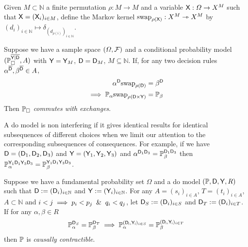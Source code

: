 \begin{definition}
Given $M\subset \mathbb{N}$ a finite permutation $\rho:M\to M$ and a variable $\mathsf{X}:\Omega\to X^M$ such that $\mathsf{X}=(\mathsf{X}_i)_{i\in M}$, define the Markov kernel $\text{swap}_{\rho(\mathsf{X})}:X^M\rightarrowtriangle X^M$ by $(d_i)_{i\in\mathbb{N}}\mapsto \delta_{(d_{\rho(i)})_{i\in\mathbb{N}}}$.
\end{definition}

\begin{definition}\label{def:caus_exch}
Suppose we have a sample space $(\Omega,\mathcal{F})$ and a conditional probability model $(\mathbb{P}_{\square}^{\overline{\mathsf{Y}|\mathsf{D}}},A)$ with $\mathsf{Y}=\mathsf{Y}_M$, $\mathsf{D}=\mathsf{D}_M$, $M\subseteq \mathbb{N}$. If, for any two decision rules $\alpha^{\overline{\mathsf{D}}},\beta^{\overline{\mathsf{D}}} \in A$,
\begin{align}
    \alpha^{\mathsf{D}}\text{swap}_{\rho(\mathsf{D})} &= \beta^{\mathsf{D}}\\
    \implies  \mathbb{P}_\alpha\text{swap}_{\rho(\mathsf{D}\times \mathsf{Y})}&=\mathbb{P}_\beta
\end{align}
Then $\mathbb{P}_\square$ \emph{commutes with exchanges}.
\end{definition}

A do model is non interfering if it gives identical results for identical subsequences of different choices when we limit our attention to the corresponding subsequences of consequences. For example, if we have $\mathsf{D}=(\mathsf{D}_1,\mathsf{D}_2,\mathsf{D}_3)$ and $\mathsf{Y}=(\mathsf{Y}_1,\mathsf{Y}_2,\mathsf{Y}_3)$ and $\alpha^{\mathsf{D}_1\mathsf{D}_3}=\mathbb{P}_\beta^{\mathsf{D}_1\mathsf{D}_3}$ then $\mathbb{P}_{\alpha}^{\mathsf{Y}_1\mathsf{D}_1\mathsf{Y}_3\mathsf{D}_3}=\mathbb{P}_\beta^{\mathsf{Y}_1\mathsf{D}_1\mathsf{Y}_3\mathsf{D}_3}$.

\begin{definition}\label{def:caus_cont}
Suppose we have a fundamental probability set $\Omega$ and a do model $(\mathbb{P},\mathsf{D},\mathsf{Y},R)$ such that $\mathsf{D}:=(\mathsf{D}_i)_{i\in \mathbb{N}}$ and $\mathsf{Y}:=(\mathsf{Y}_i)_{i\in\mathbb{N}}$. For any $A=(s_i)_{i\in A}$, $T=(t_i)_{i\in A}$, $A\subset\mathbb{N}$ and $i<j\implies p_i<p_j \And q_i<q_j$, let $\mathsf{D}_S:=(\mathsf{D}_i)_{i\in S}$ and $\mathsf{D}_T:=(\mathsf{D}_i)_{i\in T}$. If for any $\alpha,\beta\in R$
\begin{align}
    \mathbb{P}_\alpha^{\mathsf{D}_{S}}=\mathbb{P}_\beta^{\mathsf{D}_{T}}\implies \mathbb{P}_\alpha^{(\mathsf{D_i,Y_i})_{i\in S}}=\mathbb{P}_\beta^{(\mathsf{D_i,Y_i})_{i\in T}}
\end{align}
then $\mathbb{P}$ is \emph{causally contractible}.
\end{definition}

